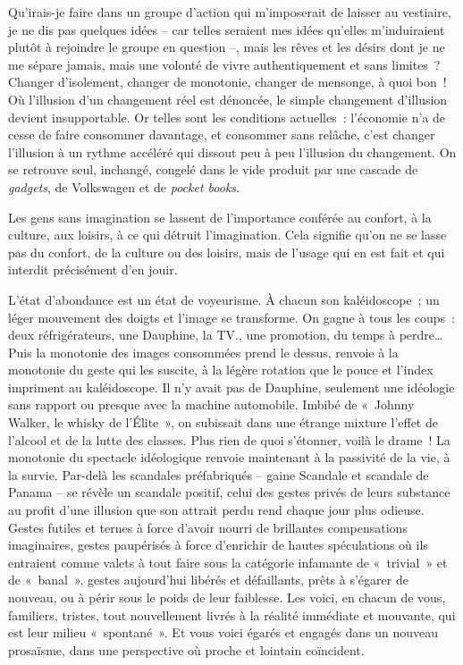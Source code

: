 \documentclass[french,twoside]{book} %
\newcommand{\astermono}{\medskip\centerline{\color{rubric}\large\selectfont{\syms ✻}}\medskip\par}%
\begin{document}
\astermono

\noindent Qu’irais-je faire dans un groupe d’action qui m’imposerait de laisser au vestiaire, je ne dis pas quelques idées – car telles seraient mes idées qu’elles m’induiraient plutôt à rejoindre le groupe en question –, mais les rêves et les désirs dont je ne me sépare jamais, mais une volonté de vivre authentiquement et sans limites ? Changer d’isolement, changer de monotonie, changer de mensonge, à quoi bon ! Où l’illusion d’un changement réel est dénoncée, le simple changement d’illusion devient insupportable. Or telles sont les conditions actuelles : l’économie n’a de cesse de faire consommer davantage, et consommer sans relâche, c’est changer l’illusion à un rythme accéléré qui dissout peu à peu l’illusion du changement. On se retrouve seul, inchangé, congelé dans le vide produit par une cascade de \emph{gadgets}, de Volkswagen et de \emph{pocket books}.\par
Les gens sans imagination se lassent de l’importance conférée au confort, à la culture, aux loisirs, à ce qui détruit l’imagination. Cela signifie qu’on ne se lasse pas du confort, de la culture ou des loisirs, mais de l’usage qui en est fait et qui interdit précisément d’en jouir.\par
L’état d’abondance est un état de voyeurisme. À chacun son kaléidoscope ; un léger mouvement des doigts et l’image se transforme. On gagne à tous les coups : deux réfrigérateurs, une Dauphine, la TV., une promotion, du temps à perdre… Puis la monotonie des images consommées prend le dessus, renvoie à la monotonie du geste qui les suscite, à la légère rotation que le pouce et l’index impriment au kaléidoscope. Il n’y avait pas de Dauphine, seulement une idéologie sans rapport ou presque avec la machine automobile. Imbibé de « Johnny Walker, le whisky de l’Élite », on subissait dans une étrange mixture l’effet de l’alcool et de la lutte des classes. Plus rien de quoi s’étonner, voilà le drame ! La monotonie du spectacle idéologique renvoie maintenant à la passivité de la vie, à la survie. Par-delà les scandales préfabriqués – gaine Scandale et scandale de Panama – se révèle un scandale positif, celui des gestes privés de leurs substance au profit d’une illusion que son attrait perdu rend chaque jour plus odieuse. Gestes futiles et ternes à force d’avoir nourri de brillantes compensations imaginaires, gestes paupérisés à force d’enrichir de hautes spéculations où ils entraient comme valets à tout faire sous la catégorie infamante de « trivial » et de « banal », gestes aujourd’hui libérés et défaillants, prêts à s’égarer de nouveau, ou à périr sous le poids de leur faiblesse. Les voici, en chacun de vous, familiers, tristes, tout nouvellement livrés à la réalité immédiate et mouvante, qui est leur milieu « spontané ». Et vous voici égarés et engagés dans un nouveau prosaïsme, dans une perspective où proche et lointain coïncident.
\end{document}
